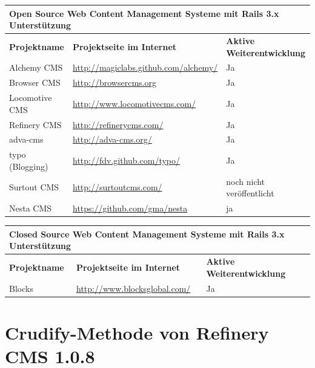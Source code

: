 
\begin{table}
\center
\addtocounter{footnote}{1}
\begin{tabular}[]{|p{3cm}|p{8cm}|p{4cm}|}
\hline
\multicolumn{3}{|p{15cm}|}{\textbf{Open Source Web Content Management Systeme mit Rails 3.x Unterstützung}}\\
\hline
\textbf{Projektname}&\textbf{Projektseite im Internet}&\textbf{Aktive Weiterentwicklung}\\
\hline
Alchemy CMS & \href{http://magiclabs.github.com/alchemy/}{http://magiclabs.github.com/alchemy/} & Ja \\
\hline
Browser CMS & \href{http://browsercms.org}{http://browsercms.org} & Ja \\
\hline
Locomotive CMS & \href{http://www.locomotivecms.com/}{http://www.locomotivecms.com/} & Ja \\
\hline
Refinery CMS & \href{http://refinerycms.com/}{http://refinerycms.com/} & Ja \\
\hline
adva-cms & \href{http://adva-cms.org/}{http://adva-cms.org/} & Ja \\
\hline
typo (Blogging) & \href{http://fdv.github.com/typo/}{http://fdv.github.com/typo/} & Ja \\
\hline
Surtout CMS & \href{http://surtoutcms.com/}{http://surtoutcms.com/} & noch nicht veröffentlicht \\
\hline
Nesta CMS & \href{https://github.com/gma/nesta}{https://github.com/gma/nesta} & ja  \\
\hline
\end{tabular}
\end{table}

\begin{table}
\center
\begin{tabular}[]{|p{3cm}|p{8cm}|p{4cm}|}
\hline
\multicolumn{3}{|p{15cm}|}{\textbf{Closed Source Web Content Management Systeme mit Rails 3.x Unterstützung}}\\
\hline
\textbf{Projektname}&\textbf{Projektseite im Internet}&\textbf{Aktive Weiterentwicklung}\\
\hline
Blocks & \href{http://www.blocksglobal.com/}{http://www.blocksglobal.com/} & Ja \\
\hline
\end{tabular}
\end{table}


\newpage


\section{Crudify-Methode von Refinery CMS 1.0.8}


